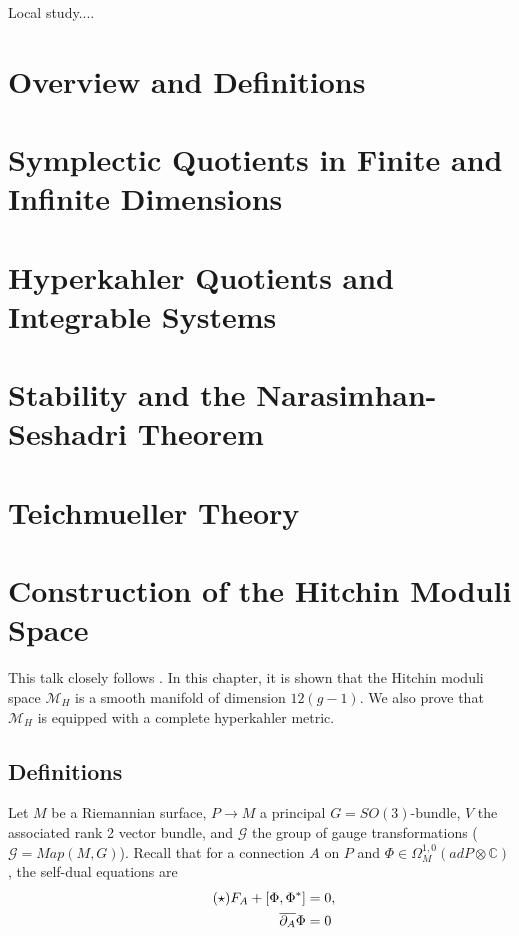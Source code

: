 \documentclass[oneside,english]{amsbook}
\numberwithin{section}{chapter}
\numberwithin{equation}{section}
\numberwithin{figure}{section}
\theoremstyle{plain}
\theoremstyle{definition}
\theoremstyle{remark}
\theoremstyle{definition}
\theoremstyle{definition}
\theoremstyle{plain}
\begin{document}
Local study....




\chapter{Overview and Definitions}


\chapter{Symplectic Quotients in Finite and Infinite Dimensions}


\chapter{Hyperkahler Quotients and Integrable Systems}


\chapter{Stability and the Narasimhan-Seshadri Theorem}


\chapter{Teichmueller Theory}


\chapter{Construction of the Hitchin Moduli Space}


This talk closely follows \cite{H1}. In this chapter, it is shown
that the Hitchin moduli space $\mathcal{M}_{H}$ is a smooth manifold
of dimension $12(g-1)$. We also prove that $\mathcal{M}_{H}$ is
equipped with a complete hyperkahler metric.


\section{Definitions}

Let $M$ be a Riemannian surface, $P\rightarrow M$ a principal $G=SO\left(3\right)$-bundle,
$V$ the associated rank 2 vector bundle, and $\mathcal{G}$ the group
of gauge transformations ($\mathcal{G}=Map\left(M,G\right)$). Recall
that for a connection $A$ on $P$ and $\Phi\in\Omega_{M}^{1,0}\left(adP\otimes\mathbb{C}\right)$,
the self-dual equations are
\begin{align*}
\tag{\ensuremath{\star}}F_{A}+\left[\Phi,\Phi^{*}\right] & =0,\\
\overline{\partial_{A}}\Phi & =0
\end{align*}
\end{document}
